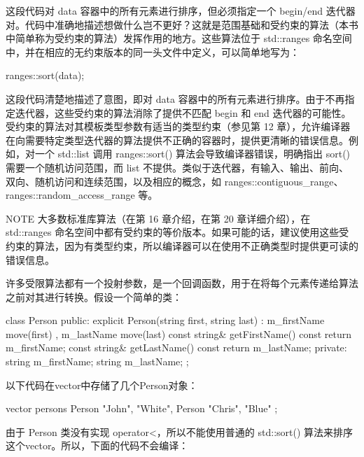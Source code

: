 这段代码对 data 容器中的所有元素进行排序，但必须指定一个 begin/end 迭代器对。代码中准确地描述想做什么岂不更好？这就是范围基础和受约束的算法（本书中简单称为受约束的算法）发挥作用的地方。这些算法位于 std::ranges 命名空间中，并在相应的无约束版本的同一头文件中定义，可以简单地写为：

\begin{cpp}
ranges::sort(data);
\end{cpp}

这段代码清楚地描述了意图，即对 data 容器中的所有元素进行排序。由于不再指定迭代器，这些受约束的算法消除了提供不匹配 begin 和 end 迭代器的可能性。受约束的算法对其模板类型参数有适当的类型约束（参见第 12 章），允许编译器在向需要特定类型迭代器的算法提供不正确的容器时，提供更清晰的错误信息。例如，对一个 std::list 调用 ranges::sort() 算法会导致编译器错误，明确指出 sort() 需要一个随机访问范围，而 list 不提供。类似于迭代器，有输入、输出、前向、双向、随机访问和连续范围，以及相应的概念，如 ranges::contiguous\_range、ranges::random\_access\_range 等。

\begin{myNotic}{NOTE}
大多数标准库算法（在第 16 章介绍，在第 20 章详细介绍），在 std::ranges 命名空间中都有受约束的等价版本。如果可能的话，建议使用这些受约束的算法，因为有类型约束，所以编译器可以在使用不正确类型时提供更可读的错误信息。
\end{myNotic}


许多受限算法都有一个投射参数，是一个回调函数，用于在将每个元素传递给算法之前对其进行转换。假设一个简单的类：

\begin{cpp}
class Person
{
    public:
        explicit Person(string first, string last)
            : m_firstName { move(first) }, m_lastName { move(last) } { }
        const string& getFirstName() const { return m_firstName; }
        const string& getLastName() const { return m_lastName; }
    private:
        string m_firstName;
        string m_lastName;
};
\end{cpp}

以下代码在vector中存储了几个Person对象：

\begin{cpp}
vector persons { Person {"John", "White"}, Person {"Chris", "Blue"} };
\end{cpp}

由于 Person 类没有实现 operator<，所以不能使用普通的 std::sort() 算法来排序这个vector。所以，下面的代码不会编译：

